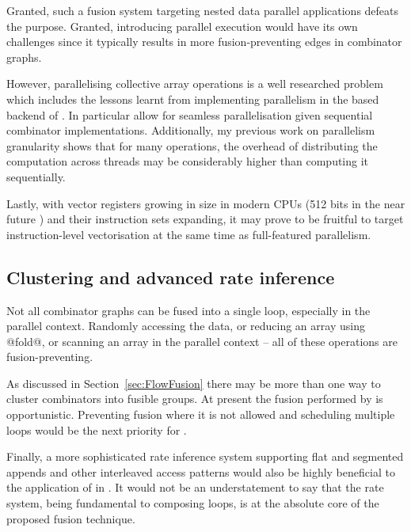 \documentclass[preamble.tex]{subfiles}
\begin{document}
Granted, such a fusion system targeting nested data parallel applications defeats the purpose. Granted, introducing parallel execution would have its own challenges since it typically results in more fusion-preventing edges in combinator graphs.

However, parallelising collective array operations is a well researched problem which includes the lessons learnt from implementing parallelism in the \StreamFusion based backend of \DPH. In particular  \cite{CLP+07} allow for seamless parallelisation given sequential combinator implementations. Additionally, my previous work on parallelism granularity shows that for many operations, the overhead of distributing the computation across threads may be considerably higher than computing it sequentially.

Lastly, with vector registers growing in size in modern CPUs (512 bits in the near future \cite{IntelISA}) and their instruction sets expanding, it may prove to be fruitful to target instruction-level vectorisation at the same time as full-featured parallelism.



\subsection{Clustering and advanced rate inference}

Not all combinator graphs can be fused into a single loop, especially in the parallel context. Randomly accessing the data, or reducing an array using @fold@, or scanning an array in the parallel context -- all of these operations are fusion-preventing.

As discussed in Section~\ref{sec:FlowFusion} there may be more than one way to cluster combinators into fusible groups. At present the fusion performed by \LiveFusion is opportunistic. Preventing fusion where it is not allowed and scheduling multiple loops would be the next priority for \LiveFusion.

Finally, a more sophisticated rate inference system supporting flat and segmented appends and other interleaved access patterns would also be highly beneficial to the application of \LiveFusion in \DPH. It would not be an understatement to say that the rate system, being fundamental to composing loops, is at the absolute core of the proposed fusion technique.






\IfNotCompilingAll{\printbibliography}
\end{document}
